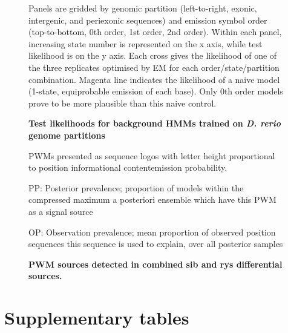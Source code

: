 \begin{figure}[!h]
    \caption{{\bf Test likelihoods for background HMMs trained on \textit{D. rerio} genome partitions}}
    Panels are gridded by genomic partition (left-to-right, exonic, intergenic, and periexonic sequences) and emission symbol order (top-to-bottom, 0th order, 1st order, 2nd order). Within each panel, increasing state number is represented on the x axis, while test likelihood is on the y axis. Each cross gives the likelihood of one of the three replicates optimised by EM for each order/state/partition combination. Magenta line indicates the likelihood of a naive model (1-state, equiprobable emission of each base). Only 0th order models prove to be more plausible than this naive control.
    \label{BHMMlh}
\end{figure}

\begin{figure}[!h]
    \caption{{\bf PWM sources detected in combined sib and rys differential sources.}}
    PWMs presented as sequence logos with letter height proportional to position informational content\/emission probability.
    
    PP: Posterior prevalence; proportion of models within the compressed maximum a posteriori ensemble which have this PWM as a signal source

    OP: Observation prevalence; mean proportion of observed position sequences this sequence is used to explain, over all posterior samples
    \label{combinedmotifs}
\end{figure}

\FloatBarrier

\section{Supplementary tables}

